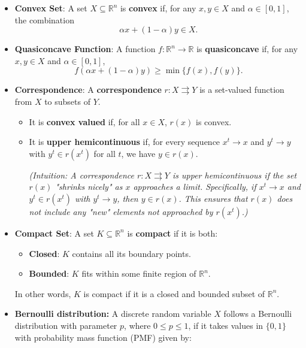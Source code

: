 \documentclass{article}
\begin{document}
\begin{itemize}

    \item \textbf{Convex Set}:
    A set \( X \subseteq \mathbb{R}^n \) is \textbf{convex} if, for any \( x, y \in X \) and \( \alpha \in [0, 1] \), the combination
    \[
    \alpha x + (1 - \alpha) y \in X.
    \]

    \item \textbf{Quasiconcave Function}:
    A function \( f : \mathbb{R}^n \to \mathbb{R} \) is \textbf{quasiconcave} if, for any \( x, y \in X \) and \( \alpha \in [0, 1] \),
    \[
    f(\alpha x + (1 - \alpha) y) \geq \min\{f(x), f(y)\}.
    \]

    \item \textbf{Correspondence}:
    A \textbf{correspondence} \( r : X \rightrightarrows Y \) is a set-valued function from \( X \) to subsets of \( Y \).
    \begin{itemize}
        \item It is \textbf{convex valued} if, for all \( x \in X \), \( r(x) \) is convex.
        \item It is \textbf{upper hemicontinuous} if, for every sequence \( x^t \to x \) and \( y^t \to y \) with \( y^t \in r(x^t) \) for all \( t \), we have \( y \in r(x) \).
        
        \textit{(Intuition: A correspondence \( r : X \rightrightarrows Y \) is upper hemicontinuous if the set \( r(x) \) "shrinks nicely" as \( x \) approaches a limit. Specifically, if \( x^t \to x \) and \( y^t \in r(x^t) \) with \( y^t \to y \), then \( y \in r(x) \). This ensures that \( r(x) \) does not include any "new" elements not approached by \( r(x^t) \).)}
    \end{itemize}

    \item \textbf{Compact Set}:
    A set \( K \subseteq \mathbb{R}^n \) is \textbf{compact} if it is both:
    \begin{itemize}
        \item \textbf{Closed}: \( K \) contains all its boundary points.
        \item \textbf{Bounded}: \( K \) fits within some finite region of \( \mathbb{R}^n \).
    \end{itemize}
    In other words, \( K \) is compact if it is a closed and bounded subset of \( \mathbb{R}^n \).

    \item \textbf{Bernoulli distribution:}\label{berno}
        A discrete random variable \( X \) follows a Bernoulli distribution with parameter \( p \), where \( 0 \leq p \leq 1 \), if it takes values in \( \{0,1\} \) with probability mass function (PMF) given by:
        

\end{itemize}
\end{document}
